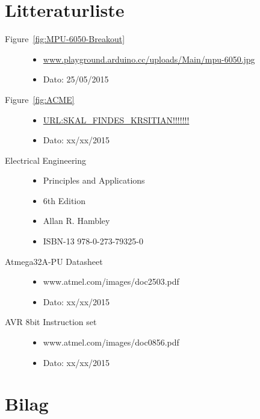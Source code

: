 \section{Litteraturliste}

\begin{description}
	\item[Figure~\ref{fig:MPU-6050-Breakout}] \hfill
		\begin{itemize}
			\item \url{www.playground.arduino.cc/uploads/Main/mpu-6050.jpg}
			\item Dato: 25/05/2015
		\end{itemize}
	\item[Figure~\ref{fig:ACME}] \hfill
		\begin{itemize}
			\item \url{URL:SKAL_FINDES_KRSITIAN!!!!!!!}
			\item Dato: xx/xx/2015
		\end{itemize}
	\item[Electrical Engineering] \hfill
		\begin{itemize}
			\item Principles and Applications
			\item 6th Edition
			\item Allan R. Hambley
			\item ISBN-13 978-0-273-79325-0
		\end{itemize}
	\item[Atmega32A-PU Datasheet] \hfill
		\begin{itemize}
			\item www.atmel.com/images/doc2503.pdf
			\item Dato: xx/xx/2015
		\end{itemize}
	\item[AVR 8bit Instruction set] \hfill
		\begin{itemize}
			\item www.atmel.com/images/doc0856.pdf
			\item Dato: xx/xx/2015
		\end{itemize}
\end{description}

\section{Bilag}

